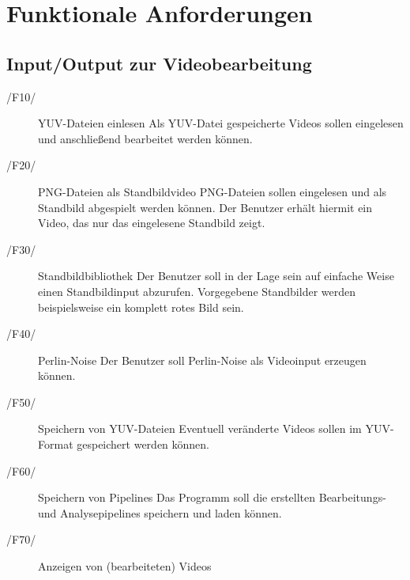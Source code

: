 \section{Funktionale Anforderungen}

\subsection{Input/Output zur Videobearbeitung}
 
\begin{description}
        \item[/F10/]YUV-Dateien einlesen \label{F10}\newline
                Als YUV-Datei gespeicherte Videos sollen eingelesen und anschließend bearbeitet werden können.
        \item[/F20/]PNG-Dateien als Standbildvideo \label{F20}\newline
                PNG-Dateien sollen eingelesen und als Standbild abgespielt werden können. Der Benutzer erhält hiermit ein Video, das nur das eingelesene Standbild zeigt.
        \item[/F30/]Standbildbibliothek \newline
                Der Benutzer soll in der Lage sein auf einfache Weise einen Standbildinput abzurufen. Vorgegebene Standbilder werden beispielsweise ein komplett rotes Bild sein.
        \item[/F40/]Perlin-Noise \newline
                Der Benutzer soll Perlin-Noise als Videoinput erzeugen können.
        \item[/F50/]Speichern von YUV-Dateien \newline
                Eventuell veränderte Videos sollen im YUV-Format gespeichert werden können.
        \item[/F60/]Speichern von Pipelines \label{F60}\newline
                Das Programm soll die erstellten Bearbeitungs- und Analysepipelines speichern und laden können.
        \item[/F70/]Anzeigen von (bearbeiteten) Videos
\end{description}
 
